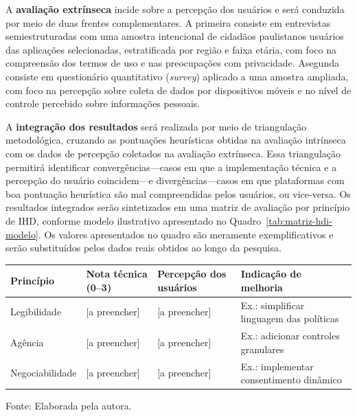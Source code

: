\documentclass[
	12pt,				%
	oneside,			%
	a4paper,			%
	english,			%
	brazil				%
	]{abntex2ppgsi}
\begin{document}
    A \textbf{avaliação extrínseca} incide sobre a percepção dos usuários e será conduzida por meio de duas frentes complementares. A primeira consiste em entrevistas semiestruturadas com uma amostra intencional de cidadãos paulistanos usuários das aplicações selecionadas, estratificada por região e faixa etária, com foco na compreensão dos termos de uso e nas preocupações com privacidade. Asegunda consiste em questionário quantitativo (\textit{survey}) aplicado a uma amostra ampliada, com foco na percepção sobre coleta de dados por dispositivos móveis e no nível de controle percebido sobre informações pessoais.

    A \textbf{integração dos resultados} será realizada por meio de triangulação metodológica, cruzando as pontuações heurísticas obtidas na avaliação intrínseca com os dados de percepção coletados na avaliação extrínseca. Essa triangulação permitirá identificar convergências---casos em que a implementação técnica e a percepção do usuário coincidem---e divergências---casos em que plataformas com boa pontuação heurística são mal compreendidas pelos usuários, ou vice-versa. Os resultados integrados serão sintetizados em uma matriz de avaliação por princípio de IHD, conforme modelo ilustrativo apresentado no Quadro~\ref{tab:matriz-hdi-modelo}. Os valores apresentados no quadro são meramente exemplificativos e serão substituídos pelos dados reais obtidos ao longo da pesquisa.

\begin{quadro}[h]
    \centering
    \caption{Modelo ilustrativo de matriz de avaliação IHD}
    \label{tab:matriz-hdi-modelo}
    \begin{tabular}{lp{2.8cm}p{2.8cm}p{4cm}}
        \hline
        \textbf{Princípio} & \textbf{Nota técnica (0--3)} &
        \textbf{Percepção dos usuários} & \textbf{Indicação de melhoria} \\
        \hline
        Legibilidade & [a preencher] & [a preencher] &
        Ex.: simplificar linguagem das políticas \\
        \hline
        Agência & [a preencher] & [a preencher] &
        Ex.: adicionar controles granulares \\
        \hline
        Negociabilidade & [a preencher] & [a preencher] &
        Ex.: implementar consentimento dinâmico \\
        \hline
    \end{tabular}

    \vspace{0.2cm}
    {\small Fonte: Elaborada pela autora.}
\end{quadro}
\end{document}
